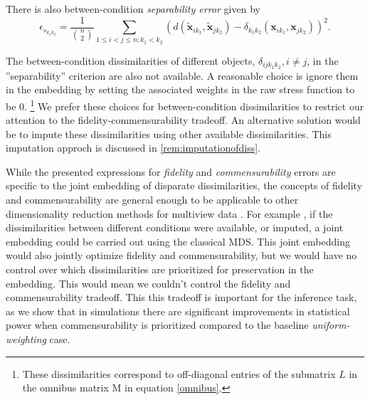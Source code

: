 \documentclass[12pt,oneside,final]{thesis}\usepackage[]{graphicx}\usepackage[]{color}
\begin{document}
 There is also between-condition {\em separability error} given by
    $$\epsilon_{s_{k_1k_2}} = \frac{1}{{{n}\choose{2}}} \sum_{1 \leq i < j \leq n;k_1 <k_2} (d(\widetilde{\bm{x}}_{ik_1},\widetilde{\bm{x}}_{jk_2})-{ \delta_{k_1k_2}}(\bm{x}_{ik_1},\bm{x}_{jk_2}))^2.$$
    


 The between-condition dissimilarities of different objects, ${ \delta_{ijk_1k_2}}, i\neq j$, in the ''separability'' criterion are also not available. A  reasonable choice is  ignore them in the embedding by setting the associated weights in the raw stress function to be 0. \footnote{These dissimilarities correspond to  off-diagonal  entries of the  submatrix $L$ in   the omnibus matrix  M in equation \eqref{omnibus}.}  
 We prefer these choices for between-condition dissimilarities to  restrict our attention to  the fidelity-commensurability tradeoff. An alternative solution would be to impute these dissimilarities using other available dissimilarities. This imputation approch is discussed in \ref{rem:imputationofdiss}.
  



While  the presented  expressions for  \emph{fidelity} and  \emph{commensurability} errors  are specific to the joint embedding of disparate dissimilarities, the concepts of fidelity and commensurability are  general enough to be applicable to other dimensionality reduction methods for multiview data .  For example , if the dissimilarities between different conditions were available, or imputed, a joint embedding could be carried out using the classical MDS. This joint embedding would also jointly optimize fidelity  and commensurability, but we would have no control over which dissimilarities are prioritized for preservation in the embedding. This would mean we couldn't control the fidelity and commensurability tradeoff. This this tradeoff is important for the inference task, as we show that  in simulations  there are significant improvements in statistical power when commensurability is prioritized compared to the baseline \emph{uniform-weighting} case.
   
\end{document}
